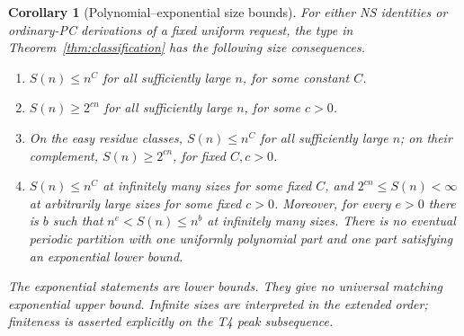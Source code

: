 \documentclass[11pt,a4paper]{article}
\newtheorem{corollary}[theorem]{Corollary}
\theoremstyle{definition}\newtheorem{definition}[theorem]{Definition}
\theoremstyle{remark}\newtheorem{remark}[theorem]{Remark}
\begin{document}
\begin{corollary}[Polynomial--exponential size bounds]\label{cor:dense-types}
For either NS identities or ordinary-PC derivations of a fixed uniform
request, the type in Theorem~\ref{thm:classification} has the following
size consequences.
\begin{enumerate}[label=\textup{T\arabic*.}]
\item $S(n)\le n^C$ for all sufficiently large $n$, for some constant $C$.
\item $S(n)\ge2^{cn}$ for all sufficiently large $n$, for some $c>0$.
\item On the easy residue classes, $S(n)\le n^C$ for all sufficiently
large $n$; on their complement, $S(n)\ge2^{cn}$, for fixed $C,c>0$.
\item $S(n)\le n^C$ at infinitely many sizes for some fixed $C$, and
$2^{cn}\le S(n)<\infty$ at arbitrarily large sizes for some fixed $c>0$.
Moreover, for every $e>0$ there is $b$ such that
$n^e<S(n)\le n^b$ at infinitely many sizes. There is no eventual periodic
partition with one uniformly polynomial part and one part satisfying an
exponential lower bound.
\end{enumerate}
The exponential statements are lower bounds. They give no universal
matching exponential upper bound. Infinite sizes are interpreted in the
extended order; finiteness is asserted explicitly on the T4 peak
subsequence.
\end{corollary}
\end{document}
